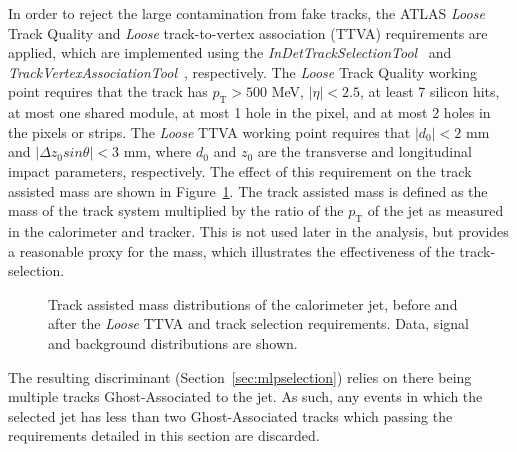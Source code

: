 \documentclass[NOTE, atlasdraft=true, texlive=2017, UKenglish]{\ATLASLATEXPATH atlasdoc}
\begin{document}
In order to reject the large contamination from fake tracks, the ATLAS \emph{Loose} Track Quality and \emph{Loose} track-to-vertex association (TTVA) requirements are applied, which are implemented using the \emph{InDetTrackSelectionTool}~\cite{InDetTrackSelectionTool} and \emph{TrackVertexAssociationTool}~\cite{TrackVertexAssociationTool}, respectively. The \emph{Loose} Track Quality working point requires that the track has $p_\text{T}>500$ MeV, $\vert\eta\vert<2.5$, at least 7 silicon hits, at most one shared module, at most 1 hole in the pixel, and at most 2 holes in the pixels or strips. The \emph{Loose} TTVA working point requires that $\vert d_0\vert <2$ mm and $\vert \Delta z_0sin\theta\vert <3$ mm, where $d_0$ and $z_0$ are the transverse and longitudinal impact parameters, respectively. The effect of this requirement on the track assisted mass are shown in Figure~\ref{fig:masseswithtrackselection}. The track assisted mass is defined as the mass of the track system multiplied by the ratio of the $p_\text{T}$ of the jet as measured in the calorimeter and tracker. This is not used later in the analysis, but provides a reasonable proxy for the mass, which illustrates the effectiveness of the track-selection.

\begin{figure}[!htbp]
  \centering
  \caption{Track assisted mass distributions of the calorimeter jet, before and after the \emph{Loose} TTVA and track selection requirements. Data, signal and background distributions are shown.}
  \label{fig:masseswithtrackselection}
\end{figure}

The resulting discriminant (Section~\ref{sec:mlpselection}) relies on there being multiple tracks Ghost-Associated to the jet. As such, any events in which the selected jet has less than two Ghost-Associated tracks which passing the requirements detailed in this section are discarded.%

\end{document}
